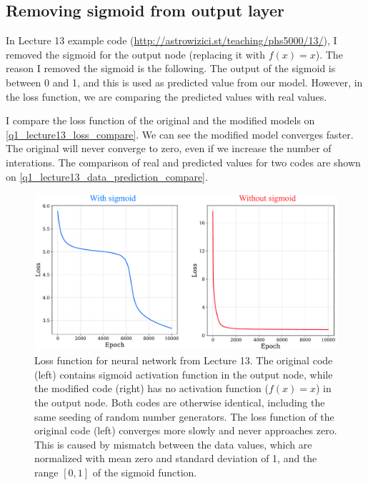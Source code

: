 \subsection*{Removing sigmoid from output layer}

In Lecture 13 example code (\url{http://astrowizici.st/teaching/phs5000/13/}), I removed the sigmoid for the output node (replacing it with $f(x) = x$). The reason I removed the sigmoid is the following. The output of the sigmoid is between 0 and 1, and this is used as predicted value from our model. However, in the loss function, we are comparing the predicted values with real values.

I compare the loss function of the original and the modified models on \autoref{q1_lecture13_loss_compare}. We can see the modified model converges faster. The original will never converge to zero, even if we increase the number of interations. The comparison of real and predicted values for two codes are shown on \autoref{q1_lecture13_data_prediction_compare}.

\begin{figure}[!ht]
  \centering
  \includegraphics[width=1\textwidth]{figures/lecture13_loss_compared.pdf}
  \caption{Loss function for neural network from Lecture 13. The original code (left) contains sigmoid activation function in the output node, while the modified code (right) has no activation function ($f(x) = x$) in the output node. Both codes are otherwise identical, including the same seeding of random number generators. The loss function of the original code (left) converges more slowly and never approaches zero. This is caused by mismatch between the data values, which are normalized with mean zero and standard deviation of 1, and the range $[0, 1]$ of the sigmoid function.}
  \label{q1_lecture13_loss_compare}
\end{figure}


